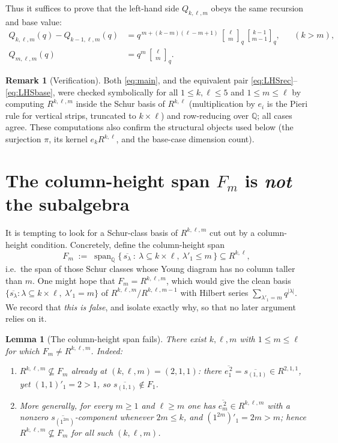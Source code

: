 \documentclass{amsart}
\newtheorem{lemma}{Lemma}
\theoremstyle{definition}
\newtheorem{remark}{Remark}
\newcommand{\qbin}[2]{\genfrac{[}{]}{0pt}{}{#1}{#2}_q}
\newcommand{\Q}{\mathbb{Q}}
\newcommand{\rkl}{R^{k,\ell}}
\newcommand{\Rklm}{R^{k,\ell,m}}
\begin{document}
Thus it suffices to prove that the left-hand side $Q_{k,\ell,m}$ obeys the same
recursion and base value:
\begin{align}
\label{eq:LHSrec}
Q_{k,\ell,m}(q)-Q_{k-1,\ell,m}(q)
&= q^{\,m+(k-m)(\ell-m+1)}\,\qbin{\ell}{m}\,\qbin{k-1}{m-1},
&&(k>m),\\
\label{eq:LHSbase}
Q_{m,\ell,m}(q)&=q^{m}\,\qbin{\ell}{m}.
\end{align}

\begin{remark}[Verification]\label{rem:verif}
Both \eqref{eq:main}, and the equivalent pair \eqref{eq:LHSrec}--\eqref{eq:LHSbase},
were checked symbolically for all $1\le k,\ell\le5$ and $1\le m\le\ell$ by computing
$\Rklm$ inside the Schur basis of $\rkl$ (multiplication by $e_i$ is the Pieri rule
for vertical strips, truncated to $k\times\ell$) and row-reducing over $\Q$; all
cases agree. These computations also confirm the structural objects used below
(the surjection $\pi$, its kernel $e_k\rkl$, and the base-case dimension count).
\end{remark}

\section{The column-height span $F_m$ is \emph{not} the subalgebra}
\label{sec:Fm}

It is tempting to look for a Schur-class basis of $\Rklm$ cut out by a column-height
condition. Concretely, define the column-height span
\[
F_m \;:=\; \operatorname{span}_{\Q}\bigl\{\,\overline{s_\lambda}\ :\
\lambda\subseteq k\times\ell,\ \lambda'_1\le m\,\bigr\}\subseteq\rkl ,
\]
i.e.\ the span of those Schur classes whose Young diagram has no column taller than
$m$. One might hope that $F_m=\Rklm$, which would give the clean basis
$\{\overline{s_\lambda}:\lambda\subseteq k\times\ell,\ \lambda'_1=m\}$ of
$\Rklm/R^{k,\ell,m-1}$ with Hilbert series $\sum_{\lambda'_1=m}q^{|\lambda|}$. We
record that \emph{this is false}, and isolate exactly why, so that no later argument
relies on it.

\begin{lemma}[The column-height span fails]\label{lem:Fmfails}
There exist $k,\ell,m$ with $1\le m\le\ell$ for which $F_m\neq\Rklm$. Indeed:
\begin{enumerate}
\item[(i)] $\Rklm\not\subseteq F_m$ already at $(k,\ell,m)=(2,1,1)$: there
$\overline{e_1^{\,2}}=\overline{s_{(1,1)}}\in R^{2,1,1}$, yet $(1,1)'_1=2>1$, so
$\overline{s_{(1,1)}}\notin F_1$.
\item[(ii)] More generally, for every $m\ge1$ and $\ell\ge m$ one has
$\overline{e_m^{\,2}}\in\Rklm$ with a nonzero $\overline{s_{(1^{2m})}}$-component
whenever $2m\le k$, and $(1^{2m})'_1=2m>m$; hence $\Rklm\not\subseteq F_m$ for all
such $(k,\ell,m)$.
\end{enumerate}
\end{lemma}
\end{document}
